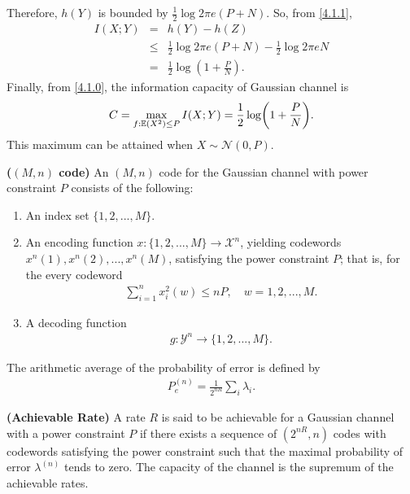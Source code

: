 %
Therefore, $h(Y)$ is bounded by $\frac{1}{2}\log 2\pi e (P+N)$. So, from \eqref{4.1.1},
%
\begin{eqnarray}
    I(X;Y) &=& h(Y)-h(Z) \nonumber\\
    &\leq& \frac{1}{2}\log 2\pi e (P+N)-\frac{1}{2}\log 2\pi e N \nonumber\\
    &=& \frac{1}{2}\log(1+\frac{P}{N}).
\end{eqnarray}
%
Finally, from \eqref{4.1.0}, the information capacity of Gaussian channel is
%
\begin{eqnarray}
    C = \max_{f:\mathbb{E}(X^2) \leq P} I(X;Y) = \frac{1}{2}\log(1+\frac{P}{N}).
\end{eqnarray}
%
This maximum can be attained when $X \sim \mathcal{N}(0,P)$.
%
\begin{tcolorbox}[boxrule=0pt,frame hidden,sharp corners,enhanced, opacityback=0, borderline west={2pt}{0pt}{red}]
\begin{defn} \textbf{($(M,n)$ code)} An $(M,n)$ code for the Gaussian channel with power constraint $P$ consists of the following:
%
\begin{enumerate}
    \item An index set $\{1,2,...,M\}$.
    \item An encoding function $x:\{1,2,...,M\} \rightarrow \mathcal{X}^n$, yielding codewords $x^n(1), x^n(2),...,x^n(M)$, satisfying the power constraint $P$; that is, for the every codeword
    \begin{eqnarray}
        \sum_{i=1}^n x_i^2(w) \leq nP, \quad w=1,2,...,M.
    \end{eqnarray}
    \item A decoding function
    \begin{eqnarray}
        g:\mathcal{Y}^n \rightarrow \{1,2,...,M\}.
    \end{eqnarray}
\end{enumerate}
%
\end{defn}
\end{tcolorbox}
%
The arithmetic average of the probability of error is defined by
%
\begin{eqnarray}
    P_e^{(n)} = \frac{1}{2^{nR}}\sum_i \lambda_i.
\end{eqnarray}
%
\begin{tcolorbox}[boxrule=0pt,frame hidden,sharp corners,enhanced, opacityback=0, borderline west={2pt}{0pt}{red}]
\begin{defn} \textbf{(Achievable Rate)} A rate $R$ is said to be achievable for a Gaussian channel with a power constraint $P$ if there exists a sequence of $(2^{nR},n)$ codes with codewords satisfying the power constraint such that the maximal probability of error $\lambda^{(n)}$ tends to zero. The capacity of the channel is the supremum of the achievable rates.
\end{defn}
\end{tcolorbox}
%
